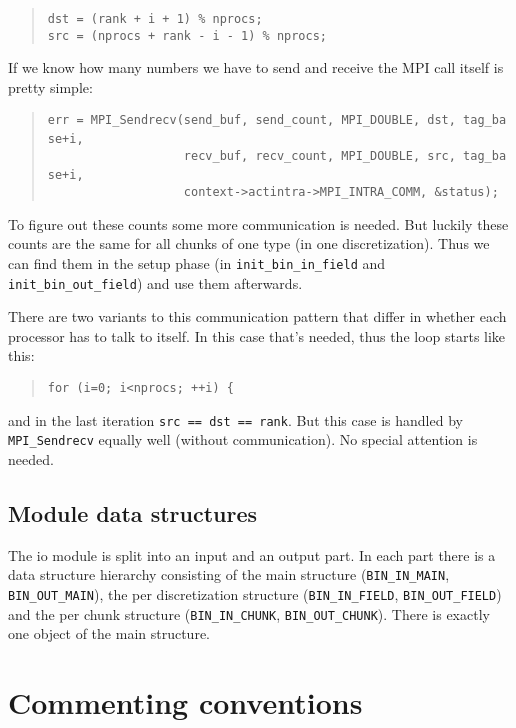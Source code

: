 \begin{quote}
\texttt{dst~=~(rank~+~i~+~1)~{\%}~nprocs;~}~\\
 \texttt{src~=~(nprocs~+~rank~-~i~-~1)~{\%}~nprocs; }
\end{quote}
If we know how many numbers we have to send and receive the MPI call
itself is pretty simple: 

\begin{quote}
\texttt{err~=~MPI{\_}Sendrecv(send{\_}buf,~send{\_}count,~MPI{\_}DOUBLE,~dst,~tag{\_}base+i,~}~\\
 \texttt{~~~~~~~~~~~~~~~~~~~recv{\_}buf,~recv{\_}count,~MPI{\_}DOUBLE,~src,~tag{\_}base+i,~}~\\
 \texttt{~~~~~~~~~~~~~~~~~~~context->actintra->MPI{\_}INTRA{\_}COMM,~{\&}status); }
\end{quote}
To figure out these counts some more communication is needed. But
luckily these counts are the same for all chunks of one type (in one
discretization). Thus we can find them in the setup phase (in \texttt{init{\_}bin{\_}in{\_}field}
and \texttt{init{\_}bin{\_}out{\_}field}) and use them afterwards.

There are two variants to this communication pattern that differ in
whether each processor has to talk to itself. In this case that's
needed, thus the loop starts like this: 

\begin{quote}
\texttt{for~(i=0;~i<nprocs;~++i)~{\{} }
\end{quote}
and in the last iteration \texttt{src == dst == rank}. But this case
is handled by \texttt{MPI{\_}Sendrecv} equally well (without communication).
No special attention is needed.


\subsection{Module data structures}

The io module is split into an input and an output part. In each part
there is a data structure hierarchy consisting of the main structure
(\texttt{BIN{\_}IN{\_}MAIN}, \texttt{BIN{\_}OUT{\_}MAIN}),
the per discretization structure (\texttt{BIN{\_}IN{\_}FIELD},
\texttt{BIN{\_}OUT{\_}FIELD}) and the per chunk structure (\texttt{BIN{\_}IN{\_}CHUNK},
\texttt{BIN{\_}OUT{\_}CHUNK}). There is exactly one object of
the main structure.

\section{Commenting conventions}

